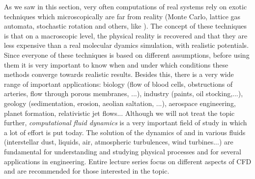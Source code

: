 As we saw in this section, very often computations of real systems rely on exotic techniques which microscopically are far from reality (Monte Carlo, lattice gas automata, stochastic rotation and others, like \citet{ballsballs}). The concept of these techniques is that on a macroscopic level, the physical reality is recovered and that they are less expensive than a real molecular dyamics simulation, with realistic potentials. Since everyone of these techniques is based on different assumptions, before using them it is very important to know when and under which conditions these methods converge towards realistic results. Besides this, there is a very wide range of important applications: biology (flow of blood cells, obstructions of arteries, flow through porous membranes, ...), industry (paints, oil stocking,...), geology (sedimentation, erosion, aeolian saltation, ...), aerospace engineering, planet formation, relativistic jet flows...
Although we will not treat the topic further, \emph{computational fluid dynamics} is a very important field of study in which a lot of effort is put today.  The solution of the dynamics of and in various fluids (interstellar dust, liquids, air, atmospheric turbulences, wind turbines...) are fundamental for understanding and studying physical processes and for several applications in engineering. Entire lecture series focus on different aspects of CFD and are recommended for those interested in the topic.











